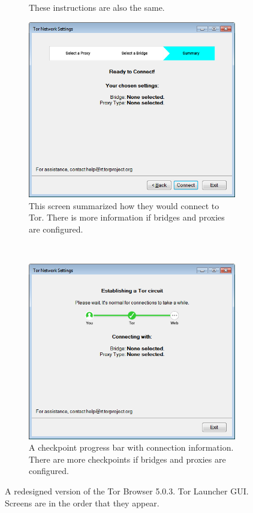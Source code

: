 \documentclass[USenglish,oneside,twocolumn]{article}
\begin{document}
\begin{figure}
\begin{subfigure}[b]{0.35\textwidth}
	\caption{These instructions are also the same.}
	\label{fig:new-bridge-help}
\end{subfigure}
\begin{subfigure}[b]{0.35\textwidth}
	\includegraphics[width=\textwidth]{screenshots/NEW-summary.png}
	\caption{This screen summarized how they would connect to Tor. There is more information if bridges and proxies are configured.}
	\label{fig:new-summary}
\end{subfigure}
~~~~~~~~~~
\begin{subfigure}[b]{0.35\textwidth}
	\includegraphics[width=\textwidth]{screenshots/NEW-progress.png}
	\caption{A checkpoint progress bar with connection information. There are more checkpoints if bridges and proxies are configured.}
	\label{fig:new-progress}
\end{subfigure}
\caption{
A redesigned version of the Tor Browser 5.0.3. Tor Launcher GUI. Screens are in the order that they appear. 
}
\label{fig:new-interface}
\end{figure} 
\end{document}
